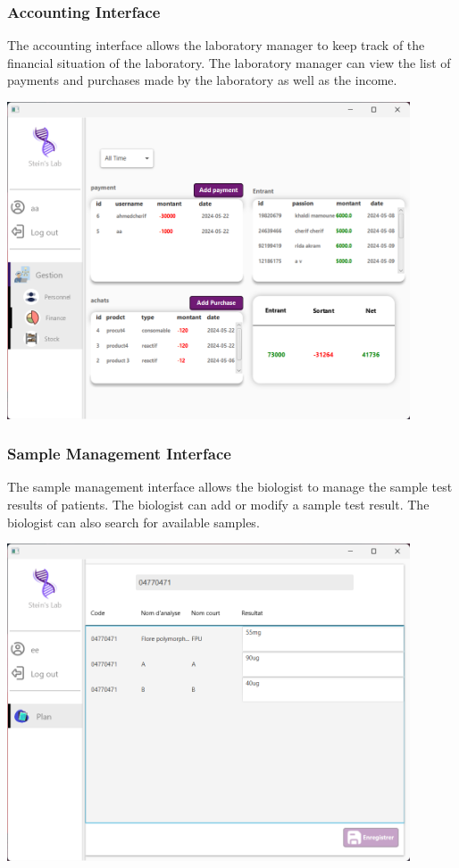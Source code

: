 \documentclass{article}
\begin{document}
\newpage
\subsubsection*{Accounting Interface}
The accounting interface allows the laboratory manager to keep track of the financial situation of the laboratory. The laboratory manager can view the list of payments and purchases made by the laboratory as well as the income.
\begin{center}
    \includegraphics[width=451px]{media/interface/gestion finance.png}
\end{center}

\newpage
\subsubsection*{Sample Management Interface}
The sample management interface allows the biologist to manage the sample test results of patients. The biologist can add or modify a sample test result. The biologist can also search for available samples.
\begin{center}
    \includegraphics[width=451px]{media/interface/sample management.png}
\end{center}
\end{document}
